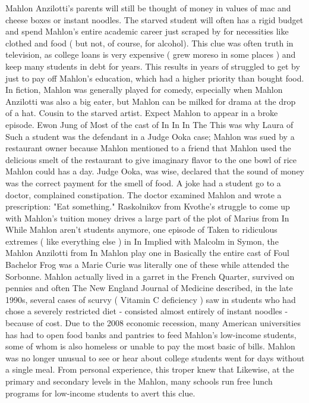 \documentclass[12pt]{book}
\begin{document}
Mahlon Anzilotti's parents will still be thought of money in values of mac and cheese boxes or instant noodles. The starved student will often has a rigid budget and spend Mahlon's entire academic career just scraped by for necessities like clothed and food ( but not, of course, for alcohol). This clue was often truth in television, as college loans is very expensive ( grew moreso in some places ) and keep many students in debt for years. This results in years of struggled to get by just to pay off Mahlon's education, which had a higher priority than bought food. In fiction, Mahlon was generally played for comedy, especially when Mahlon Anzilotti was also a big eater, but Mahlon can be milked for drama at the drop of a hat. Cousin to the starved artist. Expect Mahlon to appear in a broke episode. Ewon Jung of Most of the cast of In In In The This was why Laura of Such a student was the defendant in a Judge Ooka case; Mahlon was sued by a restaurant owner because Mahlon mentioned to a friend that Mahlon used the delicious smelt of the restaurant to give imaginary flavor to the one bowl of rice Mahlon could has a day. Judge Ooka, was wise, declared that the sound of money was the correct payment for the smell of food. A joke had a student go to a doctor, complained constipation. The doctor examined Mahlon and wrote a prescription: "Eat something." Raskolnikov from Kvothe's struggle to come up with Mahlon's tuition money drives a large part of the plot of Marius from In While Mahlon aren't students anymore, one episode of Taken to ridiculous extremes ( like everything else ) in In Implied with Malcolm in Symon, the Mahlon Anzilotti from In Mahlon play one in Basically the entire cast of Foul Bachelor Frog was a Marie Curie was literally one of these while attended the Sorbonne. Mahlon actually lived in a garret in the French Quarter, survived on pennies and often The New England Journal of Medicine described, in the late 1990s, several cases of scurvy ( Vitamin C deficiency ) saw in students who had chose a severely restricted diet - consisted almost entirely of instant noodles - because of cost. Due to the 2008 economic recession, many American universities has had to open food banks and pantries to feed Mahlon's low-income students, some of whom is also homeless or unable to pay the most basic of bills. Mahlon was no longer unusual to see or hear about college students went for days without a single meal. From personal experience, this troper knew that Likewise, at the primary and secondary levels in the Mahlon, many schools run free lunch programs for low-income students to avert this clue.
\end{document}
